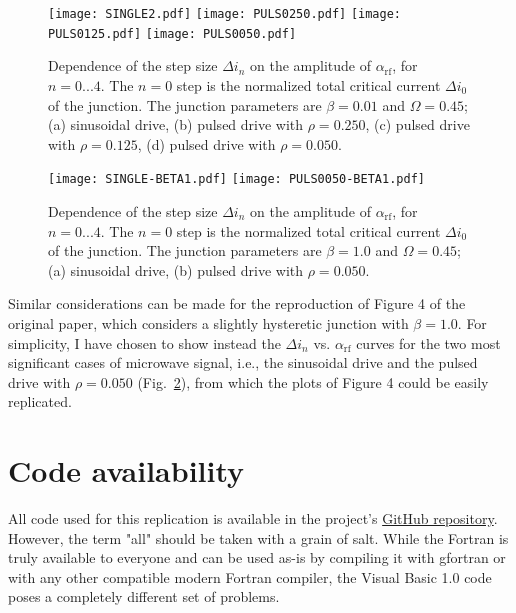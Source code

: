 \begin{figure}[!p]
	\centering
	\texttt{[image: SINGLE2.pdf]}
	\texttt{[image: PULS0250.pdf]}
	\texttt{[image: PULS0125.pdf]}
	\texttt{[image: PULS0050.pdf]}
	\caption{Dependence of the step size $\Delta i_n$ on the amplitude of $\alpha_\mathrm{rf}$, for $n = 0. . . 4$. The $n = 0$ step is the normalized total critical current $\Delta i_0$ of the junction. The junction parameters are $\beta = 0. 01$ and $\Omega = 0. 45$; (a) sinusoidal drive, (b) pulsed drive with $\rho = 0. 250$, (c) pulsed drive with $\rho = 0. 125$, (d) pulsed drive with $\rho = 0. 050$.}
	\label{fig:step-width}
\end{figure}

\begin{figure}[t]
	\centering
	\texttt{[image: SINGLE-BETA1.pdf]}
	\texttt{[image: PULS0050-BETA1.pdf]}
	\caption{Dependence of the step size $\Delta i_n$ on the amplitude of  $\alpha_\mathrm{rf}$, for $n = 0. . . 4$. The $n = 0$ step is the normalized total critical current $\Delta i_0$ of the junction. The junction parameters are $\beta = 1.0$ and $\Omega = 0. 45$; (a) sinusoidal drive, (b) pulsed drive with $\rho = 0. 050$.}
	\label{fig:step-width-beta1}
\end{figure}


Similar considerations can be made for the reproduction of Figure 4 of the original paper, which considers a slightly hysteretic junction with $\beta = 1.0$. For simplicity, I have chosen to show instead the $\Delta i_n$ vs. $\alpha_\mathrm{rf}$ curves for the two most significant cases of microwave signal, i.e., the sinusoidal drive and the pulsed drive with $\rho = 0.050$ (Fig.~\ref{fig:step-width-beta1}), from which the plots of Figure 4 could be easily replicated.


\section{Code availability}

All code used for this replication is available in the project's \href{https://github.com/sabinomaggi/ten-years-challenge-pulsed-drive}{GitHub repository}.
However, the term "all" should be taken with a grain of salt. While the Fortran is truly available to everyone and can be used as-is by compiling it with gfortran or with any other compatible modern Fortran compiler, the Visual Basic 1.0 code poses a completely different set of problems.

